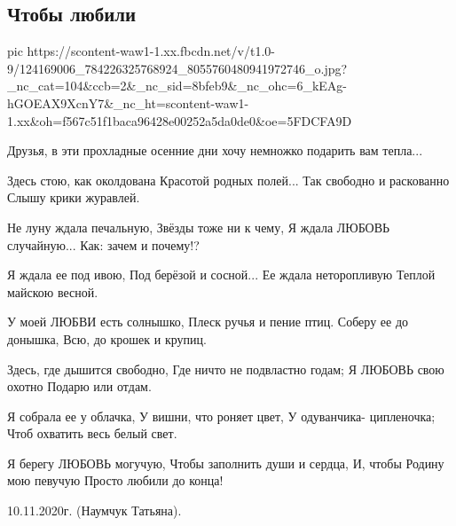  
 
 

\subsection{Чтобы любили}

\ifcmt
pic https://scontent-waw1-1.xx.fbcdn.net/v/t1.0-9/124169006_784226325768924_8055760480941972746_o.jpg?_nc_cat=104&ccb=2&_nc_sid=8bfeb9&_nc_ohc=6_kEAg-hGOEAX9XcnY7&_nc_ht=scontent-waw1-1.xx&oh=f567c51f1baca96428e00252a5da0de0&oe=5FDCFA9D
\fi

Друзья, в эти прохладные осенние дни хочу немножко подарить вам тепла... 

Здесь стою, как околдована
Красотой родных полей...
Так свободно и раскованно
Слышу крики журавлей.

Не луну ждала печальную,
Звёзды тоже ни к чему,
Я ждала ЛЮБОВЬ случайную...
Как: зачем и почему!?

Я ждала ее под ивою,
Под берёзой и сосной...
Ее ждала неторопливую
Теплой майскою весной.

У моей ЛЮБВИ есть солнышко,
Плеск ручья и пение птиц.
Соберу ее до донышка,
Всю, до крошек и крупиц.

Здесь, где дышится свободно,
Где ничто не подвластно годам;
Я ЛЮБОВЬ свою охотно
Подарю или отдам.

Я собрала ее у облачка,
У вишни, что роняет цвет,
У одуванчика- ципленочка;
Чтоб охватить весь белый свет.

Я берегу ЛЮБОВЬ могучую,
Чтобы заполнить души и сердца,
И, чтобы Родину мою певучую
Просто любили до конца!

10.11.2020г. (Наумчук Татьяна).
